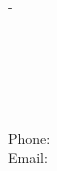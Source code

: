 \cleardoublepage
\thispagestyle{empty}
\phantom{\ }
\newpage
\AtBeginShipoutNext{\AtBeginShipoutNext{\AtBeginShipoutDiscard}}
\begin{titlingpage}
	\sffamily
	\thispagestyle{empty}
	\calccentering{\unitlength}
	\begin{adjustwidth}{\unitlength}{-\unitlength}
		\begin{adjustwidth}{-0.5cm}{-0.5cm}
			
			\noindent
			\thUniversityNameEN\\
			\thGroupNameEN\\
			\thGroupAddressStreetEN\\
			\thGroupAddressZIPCityEN\\
			\thGroupAddressCountryEN\\
			Phone: \thGroupAddressPhone\\
			Email: \thGroupAddressEmail\\
			\thGroupAddressWWW
		\end{adjustwidth}
	\end{adjustwidth}
\end{titlingpage}